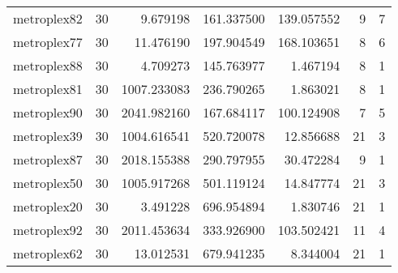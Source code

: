 \begin{longtable}{|l|r|r|r|r|r|r|}
metroplex82 & 30 & 9.679198 & 161.337500 & 139.057552 & 9 & 7 \\
metroplex77 & 30 & 11.476190 & 197.904549 & 168.103651 & 8 & 6 \\
metroplex88 & 30 & 4.709273 & 145.763977 & 1.467194 & 8 & 1 \\
metroplex81 & 30 & 1007.233083 & 236.790265 & 1.863021 & 8 & 1 \\
metroplex90 & 30 & 2041.982160 & 167.684117 & 100.124908 & 7 & 5 \\
metroplex39 & 30 & 1004.616541 & 520.720078 & 12.856688 & 21 & 3 \\
metroplex87 & 30 & 2018.155388 & 290.797955 & 30.472284 & 9 & 1 \\
metroplex50 & 30 & 1005.917268 & 501.119124 & 14.847774 & 21 & 3 \\
metroplex20 & 30 & 3.491228 & 696.954894 & 1.830746 & 21 & 1 \\
metroplex92 & 30 & 2011.453634 & 333.926900 & 103.502421 & 11 & 4 \\
metroplex62 & 30 & 13.012531 & 679.941235 & 8.344004 & 21 & 1 \\
\end{longtable}
